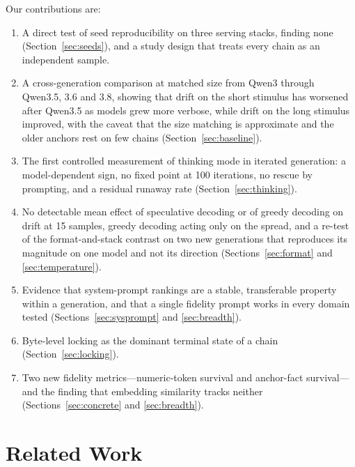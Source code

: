 \documentclass[11pt]{article}
\begin{document}
Our contributions are:
\begin{enumerate}[leftmargin=*]
  \item A direct test of seed reproducibility on three serving stacks,
        finding none (Section~\ref{sec:seeds}), and a study design that
        treats every chain as an independent sample.
  \item A cross-generation comparison at matched size from Qwen3 through
        Qwen3.5, 3.6 and 3.8, showing that drift on the short stimulus has
        worsened after Qwen3.5 as models grew more verbose, while drift on
        the long stimulus improved, with the caveat that the size matching is
        approximate and the older anchors rest on few chains
        (Section~\ref{sec:baseline}).
  \item The first controlled measurement of thinking mode in iterated
        generation: a model-dependent sign, no fixed point at 100
        iterations, no rescue by prompting, and a residual runaway rate
        (Section~\ref{sec:thinking}).
  \item No detectable mean effect of speculative decoding or of greedy
        decoding on drift at 15 samples, greedy decoding acting only on the
        spread, and a re-test of the format-and-stack contrast on two new
        generations that reproduces its magnitude on one model and not its
        direction (Sections~\ref{sec:format} and \ref{sec:temperature}).
  \item Evidence that system-prompt rankings are a stable, transferable
        property within a generation, and that a single fidelity prompt
        works in every domain tested (Sections~\ref{sec:sysprompt} and
        \ref{sec:breadth}).
  \item Byte-level locking as the dominant terminal state of a chain
        (Section~\ref{sec:locking}).
  \item Two new fidelity metrics---numeric-token survival and anchor-fact
        survival---and the finding that embedding similarity tracks neither
        (Sections~\ref{sec:concrete} and \ref{sec:breadth}).
\end{enumerate}

\section{Related Work}
\label{sec:related}
\end{document}
